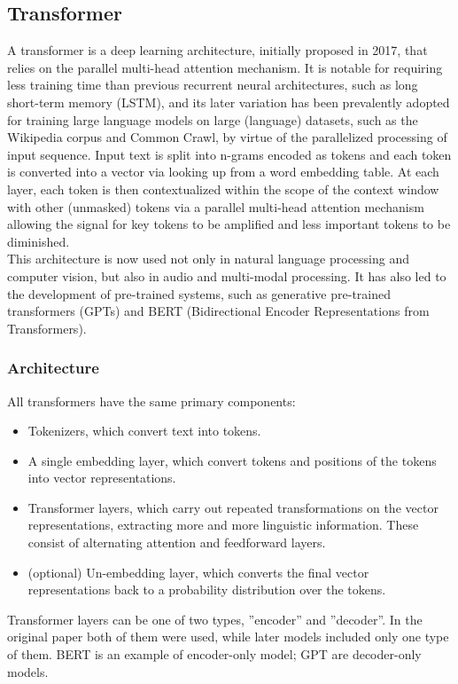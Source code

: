 \subsection{\textbf{Transformer}}
\cite{Transformer}
A transformer is a deep learning architecture, initially proposed in 2017, that relies on the parallel multi-head attention mechanism. It is notable for requiring less training time than previous recurrent neural architectures, such as long short-term memory (LSTM), and its later variation has been prevalently adopted for training large language models on large (language) datasets, such as the Wikipedia corpus and Common Crawl, by virtue of the parallelized processing of input sequence. Input text is split into n-grams encoded as tokens and each token is converted into a vector via looking up from a word embedding table. At each layer, each token is then contextualized within the scope of the context window with other (unmasked) tokens via a parallel multi-head attention mechanism allowing the signal for key tokens to be amplified and less important tokens to be diminished.
\\

This architecture is now used not only in natural language processing and computer vision, but also in audio and multi-modal processing. It has also led to the development of pre-trained systems, such as generative pre-trained transformers (GPTs) and BERT (Bidirectional Encoder Representations from Transformers).
\\
\subsubsection{\textbf{Architecture}}
All transformers have the same primary components:
\\
\begin{itemize}
    \item Tokenizers, which convert text into tokens.\\
    \item A single embedding layer, which convert tokens and positions of the tokens into vector representations.\\
    \item Transformer layers, which carry out repeated transformations on the vector representations, extracting more and more linguistic information. These consist of alternating attention and feedforward layers.\\
    \item (optional) Un-embedding layer, which converts the final vector representations back to a probability distribution over the tokens.\\
\end{itemize}
Transformer layers can be one of two types, ''encoder'' and ''decoder''. In the original paper both of them were used, while later models included only one type of them. BERT is an example of encoder-only model; GPT are decoder-only models.
\\

